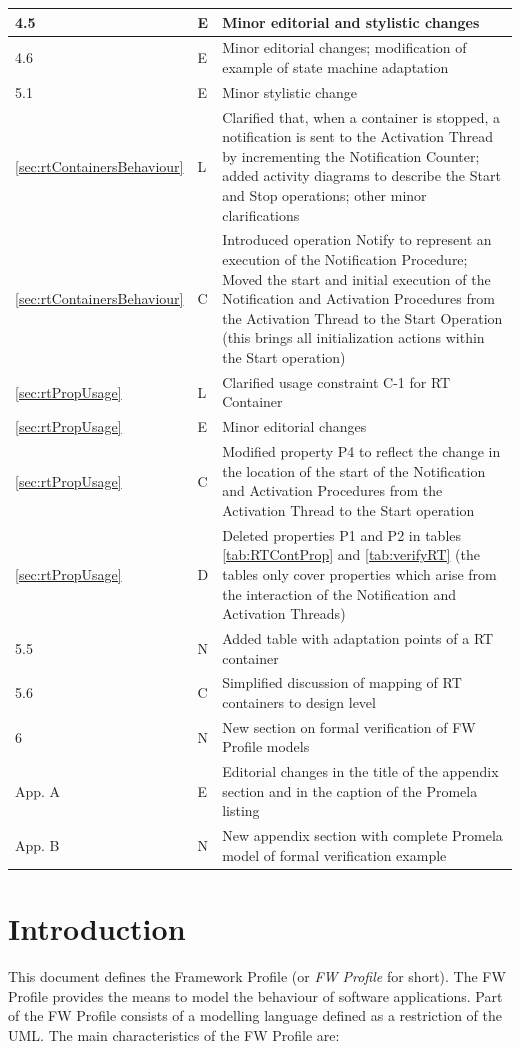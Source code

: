 \documentclass[a4paper,10pt]{article}
\let\stdsection\section
\renewcommand\section{\newpage\stdsection}
\begin{document}
\begin{longtable}{|p{1.5cm}|p{1cm}|p{8cm}|}
\hline
4.5  & E & Minor editorial and stylistic changes \\
\hline
4.6  & E & Minor editorial changes; modification of example of state machine adaptation \\
\hline
5.1  & E & Minor stylistic change \\
\hline
\ref{sec:rtContainersBehaviour}  & L & Clarified that, when a container is stopped, a notification is sent to the Activation Thread by incrementing the Notification Counter; added activity diagrams to describe the Start and Stop operations; other minor clarifications\\
\hline
\ref{sec:rtContainersBehaviour}  & C & Introduced operation Notify to represent an execution of the Notification Procedure; Moved the start and initial execution of the Notification and Activation Procedures from the Activation Thread to the Start Operation (this brings all initialization actions within the Start operation) \\
\hline
\ref{sec:rtPropUsage} & L & Clarified usage constraint C-1 for RT Container\\
\hline
\ref{sec:rtPropUsage} & E & Minor editorial changes \\
\hline
\ref{sec:rtPropUsage} & C & Modified property P4 to reflect the change in the location of the start of the Notification and Activation Procedures from the Activation Thread to the Start operation \\
\hline
\ref{sec:rtPropUsage} & D & Deleted properties P1 and P2 in tables \ref{tab:RTContProp} and \ref{tab:verifyRT} (the tables only cover properties which arise from the interaction of the Notification and Activation Threads) \\
\hline
5.5 & N & Added table with adaptation points of a RT container \\
\hline
5.6 & C & Simplified discussion of mapping of RT containers to design level \\
\hline
6 & N & New section on formal verification of FW Profile models \\
\hline
App. A & E & Editorial changes in the title of the appendix section and in the caption of the Promela listing \\
\hline
App. B & N & New appendix section with complete Promela model of formal verification example \\
\hline
\end{longtable}

\section{Introduction}
This document defines the Framework Profile (or \textit{FW Profile} for short). The FW Profile 
provides the means to model the behaviour of software applications. Part of the FW
Profile consists of a modelling language defined as a restriction of the UML.
The main characteristics of the FW Profile are:
\end{document}
